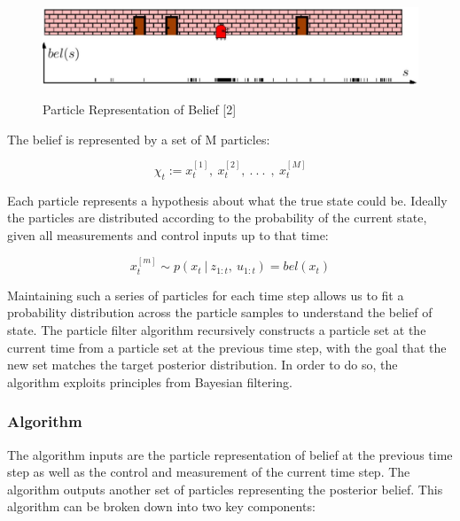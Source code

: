 \documentclass[twoside]{article}
\begin{document}
\begin{figure}[h]
    \begin{center}
    
    \includegraphics[width=0.9\linewidth, height=3cm]{particle_algorithm_pic} 
    \caption{Particle Representation of Belief [2]} 
    \label{Particle Representation of Belief [2]}
     \end{center}

\end{figure}

The belief is represented by a set of M particles: 

\begin{equation}
    \chi_t := x_t^{[1]},\  x_t^{[2]},\ .\ .\  . \ \ , \ x_t^{[M]} 
\end{equation} 

Each particle represents a hypothesis about what the true state could be. Ideally the particles are distributed according to the probability of the current state, given all measurements and control inputs up to that time: 

\begin{equation}
    x_t^{[m]} \sim  p(x_t \ |\ z_{1:t}, \ u_{1:t}) = bel(x_t) 
\end{equation} 

Maintaining such a series of particles for each time step allows us to fit a probability distribution across the particle samples to understand the belief of state. The particle filter algorithm recursively constructs a particle set at the current time from a particle set at the previous time step, with the goal that the new set matches the target posterior distribution.  In order to do so, the algorithm exploits principles from Bayesian filtering.   



\subsubsection{Algorithm}

The algorithm inputs are the particle representation of belief at the previous time step as well as the control and measurement of the current time step. The algorithm outputs another set of particles representing the posterior belief.  This algorithm can be broken down into two key components:
\end{document}
